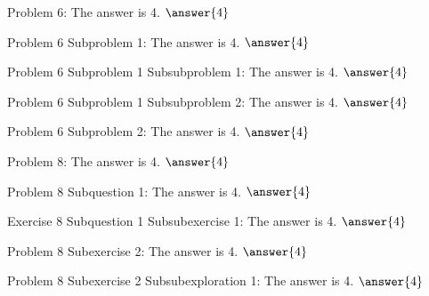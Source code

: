 \documentclass{ximera}
\begin{document}
\begin{problem}\label{problem:6}
    Problem 6: The answer is 4. $\answer{4}$
    \begin{problem}\label{problem:6.1}
        Problem 6 Subproblem 1: The answer is 4. $\answer{4}$
        \begin{problem}\label{problem:6.1.1}
            Problem 6 Subproblem 1 Subsubproblem 1: The answer is 4. $\answer{4}$
        \end{problem} 
        \begin{problem}\label{problem:6.1.2}
            Problem 6 Subproblem 1 Subsubproblem 2: The answer is 4. $\answer{4}$
        \end{problem} 
    \end{problem} 
    \begin{problem}\label{problem:6.2}
        Problem 6 Subproblem 2: The answer is 4. $\answer{4}$
    \end{problem} 
\end{problem} 


\begin{problem}\label{problem:8}
    Problem 8: The answer is 4. $\answer{4}$
    \begin{question}
        Problem 8 Subquestion 1: The answer is 4. $\answer{4}$
        \begin{exercise}
            Exercise 8 Subquestion 1 Subsubexercise 1: The answer is 4. $\answer{4}$
        \end{exercise}
    \end{question}
    \begin{exercise}
        Problem 8 Subexercise 2: The answer is 4. $\answer{4}$
        \begin{exploration}
            Problem 8 Subexercise 2 Subsubexploration 1: The answer is 4. $\answer{4}$
        \end{exploration}
    \end{exercise}
\end{problem}



\hrulefill
\end{document}
